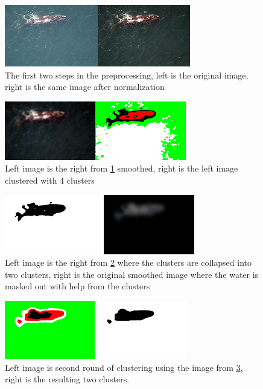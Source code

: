 \begin{figure}[H]
\centering
\includegraphics[scale=0.8]{Images/preprocess1}
\caption{The first two steps in the preprocessing, left is the original image, right is the same image after normalization}
\label{fig:step1}
\end{figure}

\begin{figure}[H]
\centering
\includegraphics{Images/preprocess2}
\caption{Left image is the right from \ref{fig:step1} smoothed, right is the left image clustered with 4 clusters}
\label{fig:step2}
\end{figure}

\begin{figure}[H]
\centering
\includegraphics{Images/preprocess3}
\caption{Left image is the right from \ref{fig:step2} where the clusters are collapsed into two clusters, right is the original smoothed image where the water is masked out with help from the clusters}
\label{fig:step3}
\end{figure}

\begin{figure}[H]
\centering
\includegraphics{Images/preprocess4}
\caption{Left image is second round of clustering using the image from \ref{fig:step3}, right is the resulting two clusters.}
\label{fig:step4}
\end{figure}


